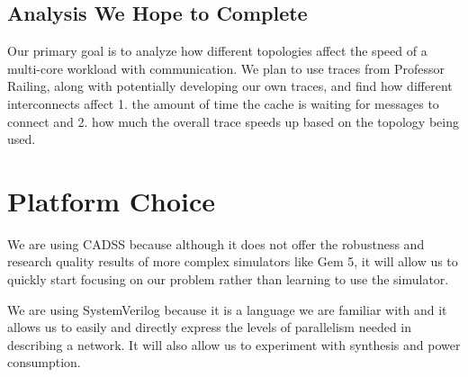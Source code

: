 \documentclass{article}
\begin{document}
\subsection{Analysis We Hope to Complete}

Our primary goal is to analyze how different topologies affect the speed of a multi-core workload with communication. We plan to use traces from Professor Railing, along with potentially developing our own traces, and find how different interconnects affect 1. the amount of time the cache is waiting for messages to connect and 2. how much the overall trace speeds up based on the topology being used. 

\section{Platform Choice}
We are using CADSS because although it does not offer the robustness and research quality results of more complex simulators like Gem 5, it will allow us to quickly start focusing on our problem rather than learning to use the simulator.

We are using SystemVerilog because it is a language we are familiar with and it allows us to easily and directly express the levels of parallelism needed in describing a network. It will also allow us to experiment with synthesis and power consumption. 
\end{document}
